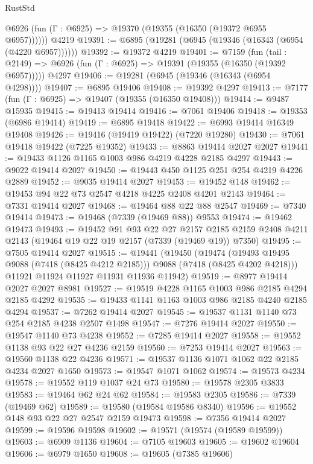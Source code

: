 \begin{lexlean}{RustStd}
\begin{coremodule}
      @6926 (fun (Γ : @6925) => @19370 (@19355 (@16350 (@19372 @6955 @6957))))))
    @4219
@19391 := @6895 (@19281 (@6945 (@19346 (@16343 (@6954 (@4220 @6957))))))
@19392 := @19372 @4219
@19401 := @7159
    (fun (tail : @2149) => @6926 (fun (Γ : @6925) => @19391 (@19355 (@16350 (@19392 @6957)))))
    @4297
@19406 := @19281 (@6945 (@19346 (@16343 (@6954 @4298))))
@19407 := @6895 @19406
@19408 := @19392 @4297
@19413 := @7177 (fun (Γ : @6925) => @19407 (@19355 (@16350 @19408)))
@19414 := @9487 @15935
@19415 := @19413 @19414
@19416 := @7061 @19406
@19418 := @19353 (@6986 @19414)
@19419 := @6895 @19418
@19422 := @6993 @19414 @16349 @19408
@19426 := @19416 (@19419 @19422) (@7220 @19280)
@19430 := @7061 @19418 @19422 (@7225 @19352)
@19433 := @8863 @19414 @2027 @2027
@19441 := @19433 @1126 @1165 @1003 @986 @4219 @4228 @2185 @4297
@19443 := @9022 @19414 @2027
@19450 := @19443 @450 @1125 @251 @254 @4219 @4226 @2889
@19452 := @9035 @19414 @2027
@19453 := @19452 @148
@19462 := @19453 @94 @22 @73 @2547 @4218 @4225 @2408 @4201 @2143
@19464 := @7331 @19414 @2027
@19468 := @19464 @88 @22 @88 @2547
@19469 := @7340 @19414
@19473 := @19468 (@7339 (@19469 @88)) @9553
@19474 := @19462 @19473
@19493 := @19452
    @91
    @93
    @22
    @27
    @2157
    @2185
    @2159
    @2408
    @4211
    @2143
    (@19464 @19 @22 @19 @2157 (@7339 (@19469 @19)) @7350)
@19495 := @7505 @19414 @2027
@19515 := @19441
    (@19450
      (@19474 (@19493 @19495 @9088 (@7418 (@8425 @4212 @2185))) @9088 (@7418 (@8425 @4202 @4218)))
      @11921
      @11924
      @11927
      @11931
      @11936
      @11942)
@19519 := @8977 @19414 @2027 @2027 @8981
@19527 := @19519 @4228 @1165 @1003 @986 @2185 @4294 @2185 @4292
@19535 := @19433 @1141 @1163 @1003 @986 @2185 @4240 @2185 @4294
@19537 := @7262 @19414 @2027
@19545 := @19537 @1131 @1140 @73 @254 @2185 @4238 @2507 @1498
@19547 := @7276 @19414 @2027
@19550 := @19547 @1140 @73 @4238
@19552 := @7285 @19414 @2027
@19558 := @19552 @1138 @93 @22 @27 @4236 @2159
@19560 := @7253 @19414 @2027
@19563 := @19560 @1138 @22 @4236
@19571 := @19537 @1136 @1071 @1062 @22 @2185 @4234 @2027 @1650
@19573 := @19547 @1071 @1062
@19574 := @19573 @4234
@19578 := @19552 @119 @1037 @24 @73
@19580 := @19578 @2305 @3833
@19583 := @19464 @62 @24 @62
@19584 := @19583 @2305
@19586 := @7339 (@19469 @62)
@19589 := @19580 (@19584 @19586 @8340)
@19596 := @19552 @148 @93 @22 @27 @2547 @2159 @19473
@19598 := @7356 @19414 @2027
@19599 := @19596 @19598
@19602 := @19571 (@19574 (@19589 @19599))
@19603 := @6909 @1136
@19604 := @7105 @19603
@19605 := @19602 @19604
@19606 := @6979 @1650
@19608 := @19605 (@7385 @19606)

\end{coremodule}
\end{lexlean}
